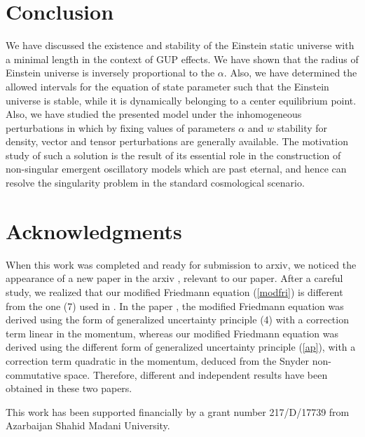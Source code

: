 \documentclass[showpacs,amsmath,nofootinbib,amssymb,epsfig]{revtex4}
\begin{document}
\section{Conclusion}
We have discussed the existence and stability of the Einstein static universe with a minimal length in the context of GUP effects. We have shown that the radius of Einstein universe is inversely proportional to the $\alpha$. Also, we have determined the allowed intervals for the equation of state parameter such that the Einstein universe is stable, while it is dynamically belonging to a center equilibrium point. Also, we have studied the presented model under the inhomogeneous perturbations in which by fixing values of parameters $\alpha$ and $w$ stability for density, vector and tensor perturbations are generally available.
The motivation study of such a solution is the result of its essential role in
the construction of non-singular emergent oscillatory models which are past eternal, and hence can resolve
the singularity problem in the standard cosmological scenario.

\section*{Acknowledgments}

When this work was completed and ready for submission to arxiv, we noticed the appearance of a new paper
in the arxiv \cite{kh}, relevant to our paper. After a careful study, we realized that  our modified Friedmann equation (\ref{modfri}) is different from the one (7) used in \cite{kh}. In the paper \cite{kh}, the modified Friedmann equation was derived using the form of
 generalized uncertainty principle (4) with a correction term linear in the
momentum, whereas our modified Friedmann equation was derived using the different
form of  generalized uncertainty principle (\ref{ap}), with a correction term quadratic in the momentum, deduced from the Snyder non-commutative space.
Therefore, different and independent results have been obtained in these
two papers.


This work has been supported financially by a grant number 217/D/17739 from Azarbaijan Shahid Madani
University.
\end{document}
